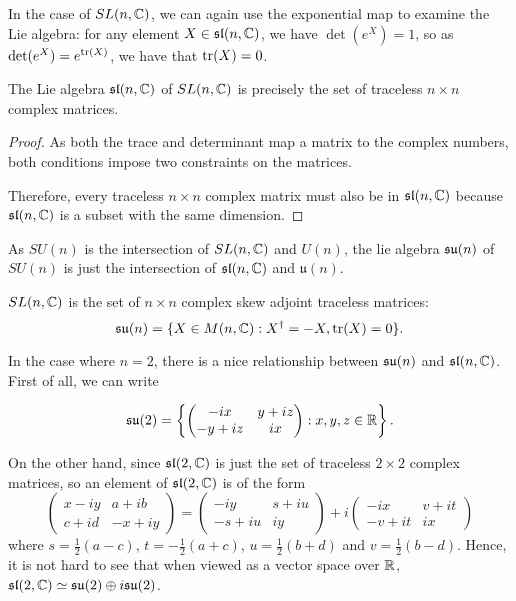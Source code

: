 \documentclass[a4paper]{article}
\begin{document}
In the case of $SL(n, \mathbb{C})$, we can again use the exponential map to examine the Lie algebra: for any element $X \in \mathfrak{sl}(n, \mathbb{C})$, we have $\det(e^X) = 1$, so as $\det(e^X) = e^{\operatorname{tr}(X)}$, we have that $\operatorname{tr}(X) = 0$. 

\begin{prop}
    The Lie algebra $\mathfrak{sl}(n, \mathbb{C})$ of $SL(n, \mathbb{C})$ is precisely the set of traceless $n \times n$ complex matrices. 
\end{prop}

\begin{proof}
    As both the trace and determinant map a matrix to the complex numbers, both conditions impose two constraints on the matrices. 
    
    Therefore, every traceless $n \times n$ complex matrix must also be in $\mathfrak{sl}(n, \mathbb{C})$ because $\mathfrak{sl}(n, \mathbb{C})$ is a subset with the same dimension.
\end{proof}

As $SU(n)$ is the intersection of $SL(n, \mathbb{C})$ and $U(n)$, the lie algebra $\mathfrak{su}(n)$ of $SU(n)$ is just the intersection of $\mathfrak{sl}(n, \mathbb{C})$ and $\mathfrak{u}(n)$. 

\begin{prop}
    $SL(n, \mathbb{C})$ is the set of $n \times n$ complex skew adjoint traceless matrices: $$\mathfrak{su}(n) = \{X \in M(n, \mathbb{C}) : X^\dagger = -X, \operatorname{tr}(X) = 0\}.$$
\end{prop}

In the case where $n = 2$, there is a nice relationship between $\mathfrak{su}(n)$ and $\mathfrak{sl}(n, \mathbb{C})$. First of all, we can write

$$\mathfrak{su}(2) = \left\{\begin{pmatrix}-ix & y+iz \\ -y + iz & ix\end{pmatrix} : x, y, z \in \mathbb{R}\right\}.$$

On the other hand, since $\mathfrak{sl}(2, \mathbb{C})$ is just the set of traceless $2 \times 2$ complex matrices, so an element of $\mathfrak{sl}(2, \mathbb{C})$ is of the form
$$
\begin{pmatrix}x-i y & a+i b \\ c + id & -x+i y\end{pmatrix} = \begin{pmatrix}-i y & s+i u \\ -s + i u & i y\end{pmatrix} + i\begin{pmatrix}-i x & v+i t \\ -v + i t & i x\end{pmatrix}
$$
where $s = \frac{1}{2}(a - c)$, $t = -\frac{1}{2}(a + c)$, $u = \frac{1}{2}(b + d)$ and $v = \frac{1}{2}(b - d)$. Hence, it is not hard to see that when viewed as a vector space over $\mathbb{R}$, $\mathfrak{sl}(2, \mathbb{C}) \simeq \mathfrak{su}(2) \oplus i \mathfrak{su}(2)$. 
\end{document}
